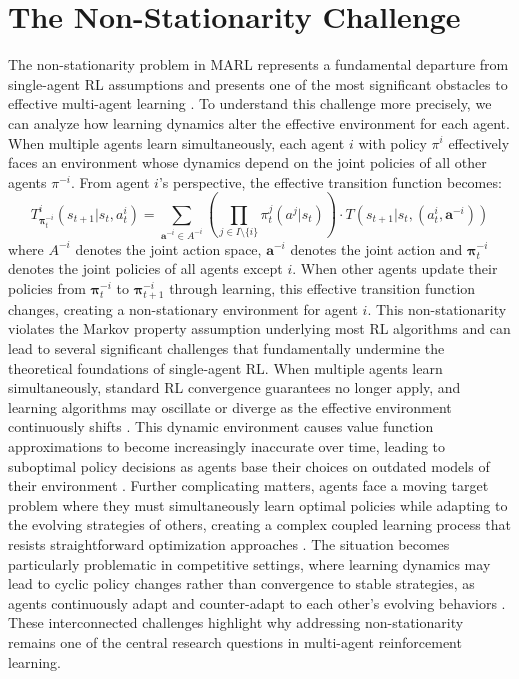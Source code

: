 \documentclass[a4paper,12pt]{report}
\begin{document}
\section{The Non-Stationarity Challenge}
The non-stationarity problem in MARL represents a fundamental departure from single-agent RL assumptions and presents one of the most significant obstacles to effective multi-agent learning \cite{hernandez2017survey, papoudakis2019dealing}. To understand this challenge more precisely, we can analyze how learning dynamics alter the effective environment for each agent. When multiple agents learn simultaneously, each agent $i$ with policy $\pi^i$ effectively faces an environment whose dynamics depend on the joint policies of all other agents $\pi^{-i}$. From agent $i$'s perspective, the effective transition function becomes:
\begin{equation}
    T^i_{\boldsymbol{\pi}^{-i}_t}(s_{t+1}|s_t, a^i_t) = \sum_{\mathbf{a}^{-i} \in A^{-i}} \left(\prod_{j \in I \setminus \{i\}} \pi^j_t(a^j|s_t)\right) \cdot T(s_{t+1}|s_t, (a^i_t, \mathbf{a}^{-i}))
\end{equation}
where $A^{-i}$ denotes the joint action space, $\mathbf{a}^{-i}$ denotes the joint action and $\boldsymbol{\pi}^{-i}_t$ denotes the joint policies of all agents except $i$. When other agents update their policies from $\boldsymbol{\pi}^{-i}_t$ to $\boldsymbol{\pi}^{-i}_{t+1}$ through learning, this effective transition function changes, creating a non-stationary environment for agent $i$. This non-stationarity violates the Markov property assumption underlying most RL algorithms and can lead to several significant challenges that fundamentally undermine the theoretical foundations of single-agent RL. When multiple agents learn simultaneously, standard RL convergence guarantees no longer apply, and learning algorithms may oscillate or diverge as the effective environment continuously shifts \cite{bowling2002multiagent}. This dynamic environment causes value function approximations to become increasingly inaccurate over time, leading to suboptimal policy decisions as agents base their choices on outdated models of their environment \cite{lauer2000algorithm}. Further complicating matters, agents face a moving target problem where they must simultaneously learn optimal policies while adapting to the evolving strategies of others, creating a complex coupled learning process that resists straightforward optimization approaches \cite{laurent2011world}. The situation becomes particularly problematic in competitive settings, where learning dynamics may lead to cyclic policy changes rather than convergence to stable strategies, as agents continuously adapt and counter-adapt to each other's evolving behaviors \cite{balduzzi2018mechanics}. These interconnected challenges highlight why addressing non-stationarity remains one of the central research questions in multi-agent reinforcement learning.
\end{document}

